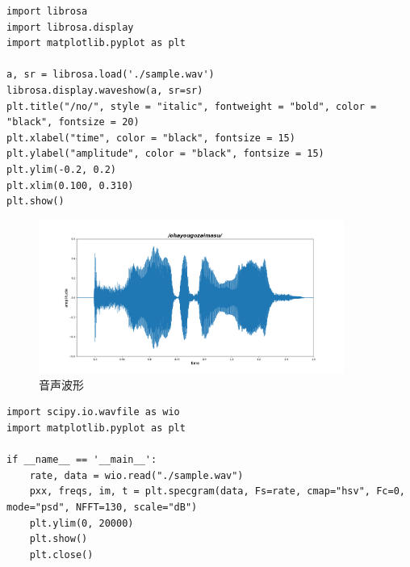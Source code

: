 \documentclass[dvipdfmx,uplatex]{jsarticle}
\begin{document}
  \textmc{\large　\\}
    \begin{lstlisting}
import librosa
import librosa.display
import matplotlib.pyplot as plt

a, sr = librosa.load('./sample.wav')
librosa.display.waveshow(a, sr=sr)
plt.title("/no/", style = "italic", fontweight = "bold", color = "black", fontsize = 20)
plt.xlabel("time", color = "black", fontsize = 15)
plt.ylabel("amplitude", color = "black", fontsize = 15)
plt.ylim(-0.2, 0.2)
plt.xlim(0.100, 0.310)
plt.show()
    \end{lstlisting}

    \begin{figure}[h]
      \begin{center}
        \includegraphics[width=100mm]{Figure_1.png}
        \caption{音声波形}
      \end{center}
    \end{figure}

    \newpage

    \begin{lstlisting}
import scipy.io.wavfile as wio
import matplotlib.pyplot as plt

if __name__ == '__main__':
    rate, data = wio.read("./sample.wav")
    pxx, freqs, im, t = plt.specgram(data, Fs=rate, cmap="hsv", Fc=0, mode="psd", NFFT=130, scale="dB")
    plt.ylim(0, 20000)
    plt.show()
    plt.close()
    \end{lstlisting}
\end{document}
